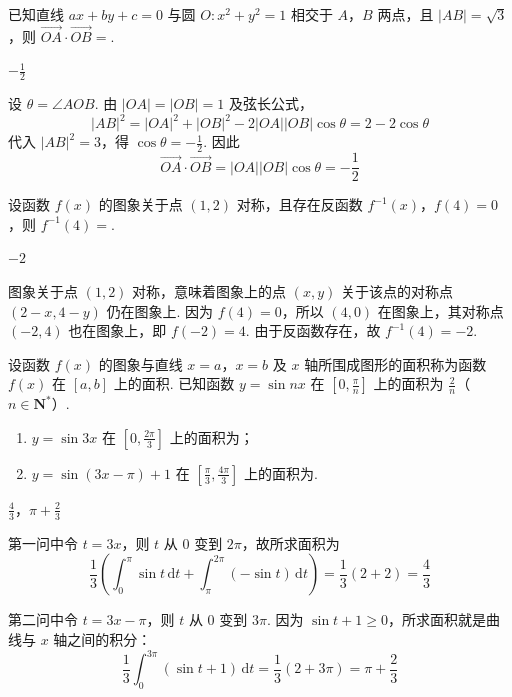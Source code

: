 \begin{problem}
已知直线 \(ax + by + c = 0\) 与圆 \(O: x^2 + y^2 = 1\) 相交于 \(A\)，\(B\) 两点，且 \(|AB| = \sqrt{3}\)，则 \(\overrightarrow{OA} \cdot \overrightarrow{OB} =\)\fillinblank{}.

\begin{answer}
\(-\frac{1}{2}\)
\end{answer}

\begin{solution}
设 \(\theta=\angle AOB\). 由 \(|OA|=|OB|=1\) 及弦长公式，
\[
|AB|^2=|OA|^2+|OB|^2-2|OA||OB|\cos\theta=2-2\cos\theta
\]
代入 \(|AB|^2=3\)，得 \(\cos\theta=-\frac12\). 因此
\[
\overrightarrow{OA}\cdot\overrightarrow{OB}=|OA||OB|\cos\theta=-\frac12
\]
\end{solution}
\end{problem}

\begin{problem}
设函数 \(f(x)\) 的图象关于点 \((1,2)\) 对称，且存在反函数 \(f^{-1}(x)\)，\(f(4) = 0\)，则 \(f^{-1}(4) =\)\fillinblank{}.

\begin{answer}
\(-2\)
\end{answer}

\begin{solution}
图象关于点 \((1,2)\) 对称，意味着图象上的点 \((x,y)\) 关于该点的对称点 \((2-x,4-y)\) 仍在图象上. 因为 \(f(4)=0\)，所以 \((4,0)\) 在图象上，其对称点 \((-2,4)\) 也在图象上，即 \(f(-2)=4\). 由于反函数存在，故 \(f^{-1}(4)=-2\).
\end{solution}
\end{problem}

\begin{problem}
设函数 \(f(x)\) 的图象与直线 \(x = a\)，\(x = b\) 及 \(x\) 轴所围成图形的面积称为函数 \(f(x)\) 在 \([a, b]\) 上的面积. 已知函数 \(y = \sin nx\) 在 \(\left[0, \frac{\pi}{n}\right]\) 上的面积为 \(\frac{2}{n}\)（\(n \in \mathbf{N}^*\)）.

\begin{enumerate}
\item \(y = \sin 3x\) 在 \(\left[0, \frac{2\pi}{3}\right]\) 上的面积为\fillinblank{}；
\item \(y = \sin (3x - \pi) + 1\) 在 \(\left[\frac{\pi}{3}, \frac{4\pi}{3}\right]\) 上的面积为\fillinblank{}.
\end{enumerate}

\begin{answer}
\(\frac{4}{3}\)，\(\pi + \frac{2}{3}\)
\end{answer}

\begin{solution}
第一问中令 \(t=3x\)，则 \(t\) 从 \(0\) 变到 \(2\pi\)，故所求面积为
\[
\frac13\left(\int_0^\pi\sin t\,\mathrm dt+\int_\pi^{2\pi}(-\sin t)\,\mathrm dt\right)=\frac13(2+2)=\frac43
\]

第二问中令 \(t=3x-\pi\)，则 \(t\) 从 \(0\) 变到 \(3\pi\). 因为 \(\sin t+1\geqslant0\)，所求面积就是曲线与 \(x\) 轴之间的积分：
\[
\frac13\int_0^{3\pi}(\sin t+1)\,\mathrm dt=\frac13(2+3\pi)=\pi+\frac23
\]
\end{solution}
\end{problem}

